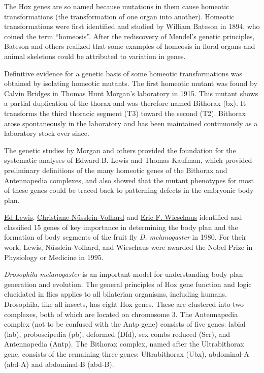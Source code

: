 The Hox genes are so named because mutations in them cause homeotic transformations (the transformation of one organ into another). Homeotic transformations were first identified and studied by William Bateson in 1894, who coined the term ``homeosis''. After the rediscovery of Mendel's genetic principles, Bateson and others realized that some examples of homeosis in floral organs and animal skeletons could be attributed to variation in genes.

Definitive evidence for a genetic basis of some homeotic transformations was obtained by isolating homeotic mutants. The first homeotic mutant was found by Calvin Bridges in Thomas Hunt Morgan's laboratory in 1915. This mutant shows a partial duplication of the thorax and was therefore named Bithorax (bx). It transforms the third thoracic segment (T3) toward the second (T2). Bithorax arose spontaneously in the laboratory and has been maintained continuously as a laboratory stock ever since.

The genetic studies by Morgan and others provided the foundation for the systematic analyses of Edward B. Lewis and Thomas Kaufman, which provided preliminary definitions of the many homeotic genes of the Bithorax and Antennapedia complexes, and also showed that the mutant phenotypes for most of these genes could be traced back to patterning defects in the embryonic body plan.

\href{https://en.wikipedia.org/wiki/Edward_B._Lewis}{Ed Lewis}, \href{Volhard}{Christiane Nüsslein-Volhard} and \href{https://en.wikipedia.org/wiki/Eric_F._Wieschaus}{Eric F. Wieschaus} identified and classified 15 genes of key importance in determining the body plan and the formation of body segments of the fruit fly \emph{D. melanogaster} in 1980. For their work, Lewis, Nüsslein-Volhard, and Wieschaus were awarded the Nobel Prize in Physiology or Medicine in 1995.

\emph{Drosophila melanogaster} is an important model for understanding body plan generation and evolution. The general principles of Hox gene function and logic elucidated in flies applies to all bilaterian organisms, including humans. Drosophila, like all insects, has eight Hox genes. These are clustered into two complexes, both of which are located on chromosome 3. The Antennapedia complex (not to be confused with the Antp gene) consists of five genes: labial (lab), proboscipedia (pb), deformed (Dfd), sex combs reduced (Scr), and Antennapedia (Antp). The Bithorax complex, named after the Ultrabithorax gene, consists of the remaining three genes: Ultrabithorax (Ubx), abdominal-A (abd-A) and abdominal-B (abd-B).

